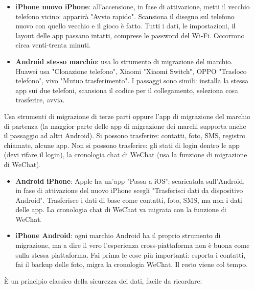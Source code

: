 \begin{itemize}
  \item \textbf{iPhone nuovo iPhone}: all'accensione, in fase di attivazione, metti il vecchio telefono vicino: apparirà "Avvio rapido". Scansiona il disegno sul telefono nuovo con quello vecchio e il gioco è fatto. Tutti i dati, le impostazioni, il layout delle app passano intatti, comprese le password del Wi-Fi. Occorrono circa venti-trenta minuti.
  \item \textbf{Android stesso marchio}: usa lo strumento di migrazione del marchio. Huawei usa "Clonazione telefono", Xiaomi "Xiaomi Switch", OPPO "Trasloco telefono", vivo "Mutuo trasferimento". I passaggi sono simili: installa la stessa app sui due telefoni, scansiona il codice per il collegamento, seleziona cosa trasferire, avvia.
\end{itemize}


Usa strumenti di migrazione di terze parti oppure l'app di migrazione del marchio di partenza (la maggior parte delle app di migrazione dei marchi supporta anche il passaggio ad altri Android). Si possono trasferire: contatti, foto, SMS, registro chiamate, alcune app. Non si possono trasferire: gli stati di login dentro le app (devi rifare il login), la cronologia chat di WeChat (usa la funzione di migrazione di WeChat).


\begin{itemize}
  \item \textbf{Android iPhone}: Apple ha un'app "Passa a iOS"; scaricatala sull'Android, in fase di attivazione del nuovo iPhone scegli "Trasferisci dati da dispositivo Android". Trasferisce i dati di base come contatti, foto, SMS, ma non i dati delle app. La cronologia chat di WeChat va migrata con la funzione di WeChat.
  \item \textbf{iPhone Android}: ogni marchio Android ha il proprio strumento di migrazione, ma a dire il vero l'esperienza cross-piattaforma non è buona come sulla stessa piattaforma. Fai prima le cose più importanti: esporta i contatti, fai il backup delle foto, migra la cronologia WeChat. Il resto viene col tempo.
\end{itemize}


È un principio classico della sicurezza dei dati, facile da ricordare:

